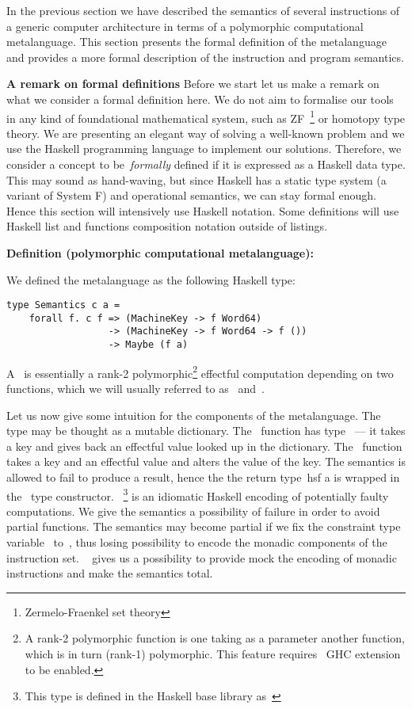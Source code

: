 
In the previous section we have described the semantics of several instructions of
a generic computer architecture in terms of a polymorphic computational metalanguage.
This section presents the formal definition of the metalanguage and provides a more
formal description of the instruction and program semantics.

\textbf{A remark on formal definitions}
Before we start let us make a remark on what we consider a formal definition here.
We do not aim to formalise our tools in any kind of foundational mathematical system,
such as ZF~\footnote{Zermelo-Fraenkel set theory} or homotopy type theory. We are
presenting an elegant way of solving a well-known problem and we use the Haskell
programming language to implement our solutions. Therefore, we consider a concept
to be~\emph{formally} defined if it is expressed as a Haskell data type. This may
sound as hand-waving, but since Haskell has a static type system (a variant of System F)
and operational semantics, we can stay formal enough. Hence this section will intensively
use Haskell notation. Some definitions will use Haskell list and functions composition
notation outside of listings.

\textbf{Definition (polymorphic computational metalanguage):}

We defined the metalanguage as the following Haskell type:

\begin{verbatim}
type Semantics c a =
    forall f. c f => (MachineKey -> f Word64)
                  -> (MachineKey -> f Word64 -> f ())
                  -> Maybe (f a)
\end{verbatim}

A~ is essentially a rank-2 polymorphic\footnote{A rank-2 polymorphic
function is one taking as a parameter another function, which is in turn (rank-1)
polymorphic. This feature requires~ GHC extension to be enabled.}
effectful computation depending on two functions,
which we will usually referred to as~ and~.

Let us now give some intuition for the components of the metalanguage.
The~
type may be thought as a mutable dictionary. The~ function has
type~ --- it takes
a key and gives back an effectful value looked up in the dictionary. The~
function takes a key and an effectful value and alters the value of the key.
The semantics is allowed to fail to produce a result, hence the
the return type~hs{f a} is wrapped in the~ type constructor.~
\footnote{This type is defined in the Haskell base library as~}
is an idiomatic Haskell encoding of potentially faulty computations. We give the
semantics a possibility of failure in order to avoid partial functions. The semantics
may become partial if we fix the constraint type variable~ to~,
thus losing possibility to encode the monadic components of the instruction set.
~ gives us a possibility to provide mock the encoding of monadic instructions
and make the semantics total.

